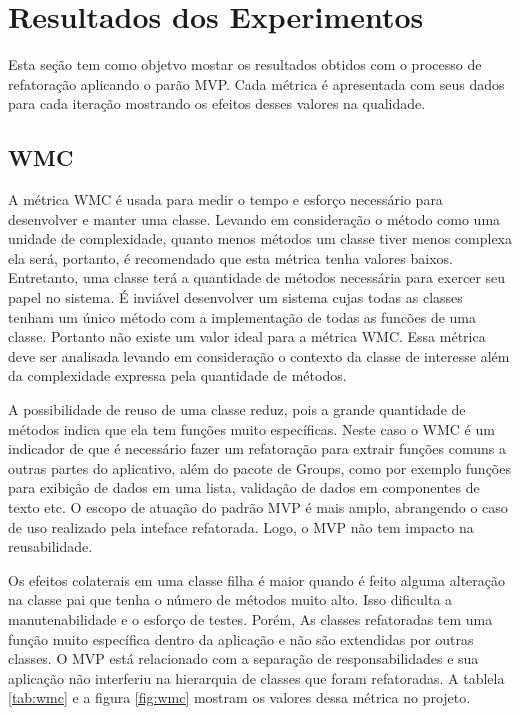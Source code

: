 \section{Resultados dos Experimentos}

Esta seção tem como objetvo mostar os resultados obtidos com o processo de
refatoração aplicando o parão MVP. Cada métrica é apresentada com seus dados
para cada iteração mostrando os efeitos desses valores na qualidade.

\subsection{WMC}

A métrica WMC é usada para medir o tempo e esforço necessário para desenvolver e
manter uma classe. Levando em consideração o método como uma unidade de
complexidade, quanto menos métodos um classe tiver menos complexa ela será,
portanto, é recomendado que esta métrica tenha valores baixos.
Entretanto, uma classe terá a quantidade de métodos necessária para exercer seu
papel no sistema. É inviável desenvolver um sistema cujas todas as classes
tenham um único método com a implementação de todas as funcões de uma
classe. Portanto não existe um valor ideal para a métrica WMC. Essa métrica deve
ser analisada levando em consideração o contexto da classe de interesse além da
complexidade expressa pela quantidade de métodos. 

A possibilidade de reuso de uma classe reduz, pois a grande quantidade de
métodos indica que ela tem funções muito específicas\cite{cksuite}. Neste caso o
WMC é um indicador de que é necessário fazer um refatoração para extrair funções comuns a outras partes do
aplicativo, além do pacote de Groups, como por exemplo funções para exibição de
dados em uma lista, validação de dados em componentes de texto etc. O escopo de
atuação do padrão MVP é mais amplo, abrangendo o caso de uso realizado pela
inteface refatorada. Logo, o MVP não tem impacto na reusabilidade.

Os efeitos colaterais em uma classe filha é maior quando é feito alguma
alteração na classe pai que tenha o número de métodos muito alto\cite{cksuite}.
Isso dificulta a manutenabilidade e o esforço de testes. Porém, As classes
refatoradas tem uma função muito específica dentro da aplicação e não são
extendidas por outras classes. O MVP está relacionado com a separação de
responsabilidades e sua aplicação não interferiu na hierarquia de classes que
foram refatoradas.
A tablela \ref{tab:wmc} e a figura \ref{fig:wmc} mostram os valores dessa
métrica no projeto.


